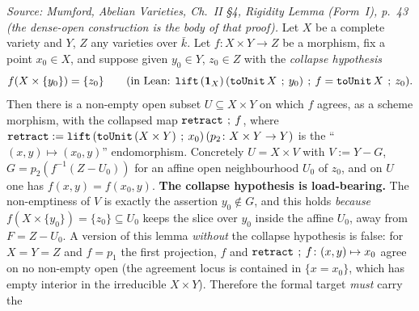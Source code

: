 \begin{lemma}
  \label{lem:rigidity_eqOn_dense_open}
  \textit{Source: Mumford, Abelian Varieties, Ch.~II \S4, Rigidity Lemma (Form~I), p.~43 (the
  dense-open construction is the body of that proof).}
  Let \(X\) be a complete variety and \(Y\), \(Z\) any varieties over \(\bar k\). Let
  \(f \colon X \times Y \to Z\) be a morphism, fix a point \(x_0 \in X\), and suppose given
  \(y_0 \in Y\), \(z_0 \in Z\) with the \emph{collapse hypothesis}
  \[ f(X \times \{y_0\}) = \{z_0\} \qquad
     \text{(in Lean: } \mathtt{lift}\,(\mathbf 1_X)\,(\mathtt{toUnit}\,X \fatsemi y_0) \fatsemi f
     = \mathtt{toUnit}\,X \fatsemi z_0\text{).} \]
  Then there is a non-empty open subset \(U \subseteq X \times Y\) on which \(f\) agrees, as a
  scheme morphism, with the collapsed map \(\mathtt{retract} \fatsemi f\), where
  \(\mathtt{retract} := \mathtt{lift}\,(\mathtt{toUnit}\,(X \times Y) \fatsemi x_0)\,
  (p_2 \colon X \times Y \to Y)\) is the ``\((x, y) \mapsto (x_0, y)\)'' endomorphism. Concretely
  \(U = X \times V\) with \(V := Y - G\), \(G = p_2(f^{-1}(Z - U_0))\) for an affine open
  neighbourhood \(U_0\) of \(z_0\), and on \(U\) one has \(f(x, y) = f(x_0, y)\).
  \medskip
  \noindent\textbf{The collapse hypothesis is load-bearing.} The non-emptiness of \(V\) is exactly
  the assertion \(y_0 \notin G\), and this holds \emph{because} \(f(X \times \{y_0\}) = \{z_0\}
  \subseteq U_0\) keeps the slice over \(y_0\) inside the affine \(U_0\), away from \(F = Z - U_0\). A
  version of this lemma \emph{without} the collapse hypothesis is false: for \(X = Y = Z\) and
  \(f = p_1\) the first projection, \(f\) and \(\mathtt{retract} \fatsemi f \colon (x, y) \mapsto x_0\)
  agree on no non-empty open (the agreement locus is contained in \(\{x = x_0\}\), which has empty
  interior in the irreducible \(X \times Y\)). Therefore the formal target \emph{must} carry the

\end{lemma}
